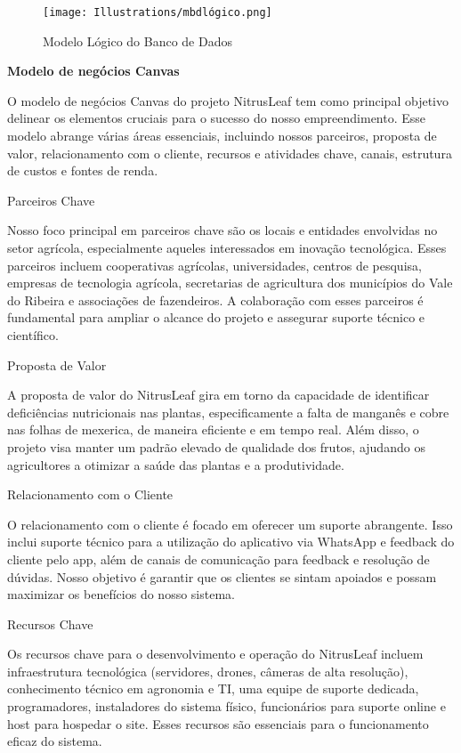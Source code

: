 \begin{figure}[H]
\centering
\caption{Modelo Lógico do Banco de Dados}%
\label{fig:mbdlogico}
\texttt{[image: Illustrations/mbdlógico.png]}
\end{figure}

\textbf{Modelo de negócios Canvas}

O modelo de negócios Canvas do projeto NitrusLeaf  tem como principal objetivo delinear os elementos cruciais para o sucesso do nosso empreendimento. Esse modelo abrange várias áreas essenciais, incluindo nossos parceiros, proposta de valor, relacionamento com o cliente, recursos e atividades chave, canais, estrutura de custos e fontes de renda.

Parceiros Chave

Nosso foco principal em parceiros chave são os locais e entidades envolvidas no setor agrícola, especialmente aqueles interessados em inovação tecnológica. Esses parceiros incluem cooperativas agrícolas, universidades, centros de pesquisa, empresas de tecnologia agrícola, secretarias de agricultura dos municípios do Vale do Ribeira e associações de fazendeiros. A colaboração com esses parceiros é fundamental para ampliar o alcance do projeto e assegurar suporte técnico e científico.

Proposta de Valor

A proposta de valor do NitrusLeaf gira em torno da capacidade de identificar deficiências nutricionais nas plantas, especificamente a falta de manganês e cobre nas folhas de mexerica, de maneira eficiente e em tempo real. Além disso, o projeto visa manter um padrão elevado de qualidade dos frutos, ajudando os agricultores a otimizar a saúde das plantas e a produtividade.

Relacionamento com o Cliente

O relacionamento com o cliente é focado em oferecer um suporte abrangente. Isso inclui suporte técnico para a utilização do aplicativo via WhatsApp e feedback do cliente pelo app, além de canais de comunicação para feedback e resolução de dúvidas. Nosso objetivo é garantir que os clientes se sintam apoiados e possam maximizar os benefícios do nosso sistema.

Recursos Chave

Os recursos chave para o desenvolvimento e operação do NitrusLeaf incluem infraestrutura tecnológica (servidores, drones, câmeras de alta resolução), conhecimento técnico em agronomia e TI, uma equipe de suporte dedicada, programadores, instaladores do sistema físico, funcionários para suporte online e host para hospedar o site. Esses recursos são essenciais para o funcionamento eficaz do sistema.

